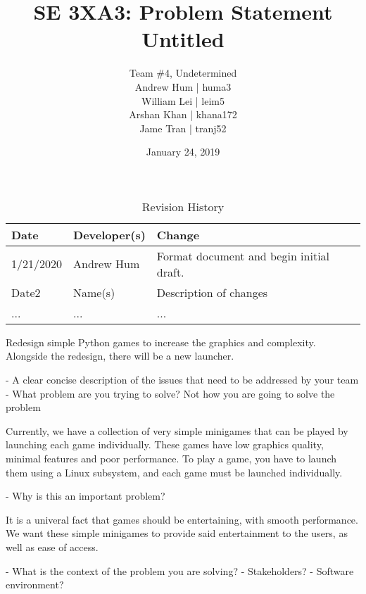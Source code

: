 \documentclass{article}
\title{SE 3XA3: Problem Statement\\Untitled}
\author{Team \#4, Undetermined
		\\ Andrew Hum | huma3
		\\ William Lei | leim5
		\\ Arshan Khan | khana172
		\\ Jame Tran | tranj52
}
\date{January 24, 2019}
\begin{document}
\begin{table}[hp]
\caption{Revision History} \label{TblRevisionHistory}
\begin{tabularx}{\textwidth}{llX}
\toprule
\textbf{Date} & \textbf{Developer(s)} & \textbf{Change}\\
\midrule
1/21/2020 & Andrew Hum & Format document and begin initial draft.\\
Date2 & Name(s) & Description of changes\\
... & ... & ...\\
\bottomrule
\end{tabularx}
\end{table}

\newpage

\maketitle

Redesign simple Python games to increase the graphics and complexity.
Alongside the redesign, there will be a new launcher.

- A clear concise description of the issues that need to be addressed by your team
- What problem are you trying to solve? Not how you are going to solve the problem

Currently, we have a collection of very simple minigames that can be played by launching each game individually. These games have 
low graphics quality, minimal features and poor performance. To play a game, you have to launch them using a Linux subsystem, and each
game must be launched individually.

- Why is this an important problem?

It is a univeral fact that games should be entertaining, with smooth performance. We want these simple minigames to provide said
entertainment to the users, as well as ease of access.

- What is the context of the problem you are solving?
	- Stakeholders?
	- Software environment?





\end{document}
